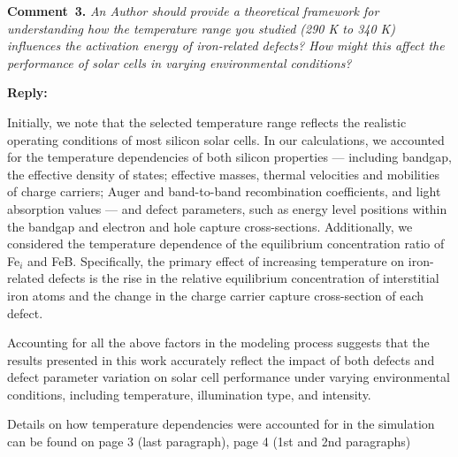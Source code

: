 \documentclass[a4paper,fleqn]{cas-sc}
\begin{document}


\vspace{1cm}
\noindent
\textcolor[rgb]{0.00,0.50,1.00}{\textbf{Comment~3.}}
\emph{An Author should provide a theoretical framework for understanding how the temperature range you studied (290 K to 340 K) influences the activation
energy of iron-related defects? How might this affect the performance of solar cells in varying environmental conditions?}





\noindent
\textcolor[rgb]{0.51,0.00,0.00}{\textbf{Reply:}}

Initially, we note that the selected temperature range reflects the
realistic operating conditions of most silicon solar cells.
In our calculations, we accounted for the temperature dependencies of both silicon properties ---
including bandgap, the effective density of states; effective masses, thermal velocities and mobilities of charge carriers;
Auger and band-to-band recombination coefficients, and light absorption values ---
and defect parameters, such as energy level positions within the bandgap and electron and hole capture cross-sections.
Additionally, we considered the temperature dependence of the equilibrium concentration ratio of Fe$_i$ and FeB.
Specifically, the primary effect of increasing temperature on iron-related defects is the rise in the relative equilibrium
concentration of interstitial iron atoms
and the change in the charge carrier capture cross-section of each defect.

Accounting for all the above factors in the modeling process suggests that
the results presented in this work accurately reflect the impact of both defects
and defect parameter variation on solar cell performance under varying environmental conditions,
including temperature,  illumination type, and intensity.

Details on how temperature dependencies were accounted for in the simulation can be found on page 3 (last paragraph),
page 4 (1st and 2nd paragraphs)
\end{document}
